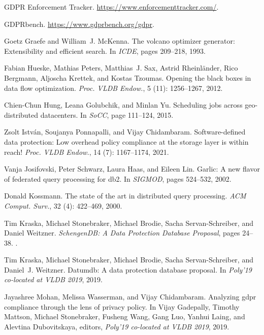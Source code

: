 \documentclass[11pt]{article}
\begin{document}
\begin{thebibliography}{10}
\begin{small}
GDPR Enforcement Tracker.
\newblock \url{https://www.enforcementtracker.com/}.

G{D}{P}{R}bench.
\newblock \url{https://www.gdprbench.org/gdpr}.

Goetz Graefe and William~J. McKenna.
\newblock The volcano optimizer generator: Extensibility and efficient search.
\newblock In \emph{ICDE}, pages 209--218, 1993.

Fabian Hueske, Mathias Peters, Matthias~J. Sax, Astrid Rheinl\"{a}nder, Rico
  Bergmann, Aljoscha Krettek, and Kostas Tzoumas.
\newblock Opening the black boxes in data flow optimization.
\newblock \emph{Proc. VLDB Endow.}, 5 (11): 1256–1267,
  2012.

Chien-Chun Hung, Leana Golubchik, and Minlan Yu.
\newblock Scheduling jobs across geo-distributed datacenters.
\newblock In \emph{SoCC}, page 111–124, 2015.

Zsolt Istv\'{a}n, Soujanya Ponnapalli, and Vijay Chidambaram.
\newblock Software-defined data protection: Low overhead policy compliance at
  the storage layer is within reach!
\newblock \emph{Proc. VLDB Endow.}, 14 (7): 1167–1174,
  2021.

Vanja Josifovski, Peter Schwarz, Laura Haas, and Eileen Lin.
\newblock Garlic: A new flavor of federated query processing for db2.
\newblock In \emph{SIGMOD}, pages 524--532, 2002.

Donald Kossmann.
\newblock The state of the art in distributed query processing.
\newblock \emph{ACM Comput. Surv.}, 32 (4): 422–469, 2000.

Tim Kraska, Michael Stonebraker, Michael Brodie, Sacha Servan-Schreiber, and
  Daniel Weitzner.
\newblock \emph{SchengenDB: A Data Protection Database Proposal}, pages 24--38.
.

Tim Kraska, Michael Stonebraker, Michael Brodie, Sacha Servan-Schreiber, and
  Daniel~J. Weitzner.
\newblock Datumdb: A data protection database proposal.
\newblock In \emph{Poly'19 co-located at VLDB 2019}, 2019.

Jayashree Mohan, Melissa Wasserman, and Vijay Chidambaram.
\newblock Analyzing gdpr compliance through the lens of privacy policy.
\newblock In Vijay Gadepally, Timothy Mattson, Michael Stonebraker, Fusheng
  Wang, Gang Luo, Yanhui Laing, and Alevtina Dubovitskaya, editors,
  \emph{Poly'19 co-located at VLDB 2019}, 2019.


\end{small}
\end{thebibliography}
\end{document}

